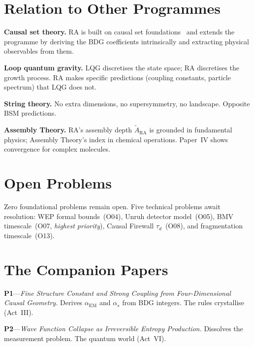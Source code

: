 \documentclass[11pt,a4paper]{article}
\theoremstyle{plain}
\theoremstyle{definition}
\theoremstyle{remark}
\begin{document}
\section{Relation to Other Programmes}\label{sec:other}

\textbf{Causal set theory.}  RA is built on causal set
foundations~\cite{BLMS1987,Sorkin2005} and extends the programme by
deriving the BDG coefficients intrinsically and extracting physical
observables from them.

\textbf{Loop quantum gravity.}  LQG discretises the state space; RA
discretises the growth process.  RA makes specific predictions (coupling
constants, particle spectrum) that LQG does not.

\textbf{String theory.}  No extra dimensions, no supersymmetry, no
landscape.  Opposite BSM predictions.

\textbf{Assembly Theory.}  RA's assembly depth $\tilde{A}_{\mathrm{RA}}$
is grounded in fundamental physics; Assembly Theory's index in chemical
operations.  Paper~IV shows convergence for complex molecules.

\section{Open Problems}\label{sec:open}

Zero foundational problems remain open.  Five technical problems await
resolution: WEP formal bounds~(O04), Unruh detector model~(O05), BMV
timescale~(O07, \emph{highest priority}), Causal Firewall
$\tau_d$~(O08), and fragmentation timescale~(O13).

\section*{The Companion Papers}

\textbf{P1}---\emph{Fine Structure Constant and Strong Coupling from
Four-Dimensional Causal Geometry.}  Derives $\alpha_{\mathrm{EM}}$ and
$\alpha_s$ from BDG integers.  The rules crystallise (Act~III).

\textbf{P2}---\emph{Wave Function Collapse as Irreversible Entropy
Production.}  Dissolves the measurement problem.  The quantum world
(Act~VI).
\end{document}
